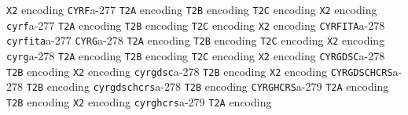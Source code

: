 \documentclass[twoside]{ltxdoc}
\makeatletter
\renewenvironment{theindex}{%
   \@restonecoltrue
   \if@twocolumn\@restonecolfalse\fi
   \columnseprule \z@
   \columnsep 35\p@
   \twocolumn[\index@prologue]%
   \IndexParms
   \let\item\@idxitem
   \ignorespaces
}{\if@restonecol\onecolumn\else\clearpage\fi}
\makeatother
\begin{document}
\begin{theindex}
    \subitem \texttt  {X2} encoding\pfill {}
  \item \texttt  {CYRF}\pfill a-277
    \subitem \texttt  {T2A} encoding\pfill {}
    \subitem \texttt  {T2B} encoding\pfill {}
    \subitem \texttt  {T2C} encoding\pfill {}
    \subitem \texttt  {X2} encoding\pfill {}
  \item \texttt  {cyrf}\pfill a-277
    \subitem \texttt  {T2A} encoding\pfill {}
    \subitem \texttt  {T2B} encoding\pfill {}
    \subitem \texttt  {T2C} encoding\pfill {}
    \subitem \texttt  {X2} encoding\pfill {}
  \item \texttt  {CYRFITA}\pfill a-278
  \item \texttt  {cyrfita}\pfill a-277
  \item \texttt  {CYRG}\pfill a-278
    \subitem \texttt  {T2A} encoding\pfill {}
    \subitem \texttt  {T2B} encoding\pfill {}
    \subitem \texttt  {T2C} encoding\pfill {}
    \subitem \texttt  {X2} encoding\pfill {}
  \item \texttt  {cyrg}\pfill a-278
    \subitem \texttt  {T2A} encoding\pfill {}
    \subitem \texttt  {T2B} encoding\pfill {}
    \subitem \texttt  {T2C} encoding\pfill {}
    \subitem \texttt  {X2} encoding\pfill {}
  \item \texttt  {CYRGDSC}\pfill a-278
    \subitem \texttt  {T2B} encoding\pfill {}
    \subitem \texttt  {X2} encoding\pfill {}
  \item \texttt  {cyrgdsc}\pfill a-278
    \subitem \texttt  {T2B} encoding\pfill {}
    \subitem \texttt  {X2} encoding\pfill {}
  \item \texttt  {CYRGDSCHCRS}\pfill a-278
    \subitem \texttt  {T2B} encoding\pfill {}
  \item \texttt  {cyrgdschcrs}\pfill a-278
    \subitem \texttt  {T2B} encoding\pfill {}
  \item \texttt  {CYRGHCRS}\pfill a-279
    \subitem \texttt  {T2A} encoding\pfill {}
    \subitem \texttt  {T2B} encoding\pfill {}
    \subitem \texttt  {X2} encoding\pfill {}
  \item \texttt  {cyrghcrs}\pfill a-279
    \subitem \texttt  {T2A} encoding\pfill {}

\end{theindex}
\end{document}
